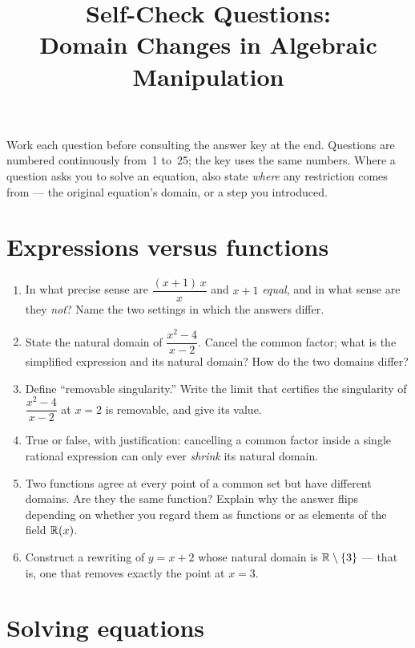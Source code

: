 \documentclass{essay}
\title{Self-Check Questions:\\Domain Changes in Algebraic Manipulation}
\author{}
\date{}
\begin{document}
\maketitle

Work each question before consulting the answer key at the end. Questions are numbered
continuously from~1 to~25; the key uses the same numbers. Where a question asks you to
solve an equation, also state \emph{where} any restriction comes from --- the original
equation's domain, or a step you introduced.

\section{Expressions versus functions}

\begin{enumerate}

  \item In what precise sense are $\dfrac{(x+1)\,x}{x}$ and $x+1$ \emph{equal}, and in what
    sense are they \emph{not}? Name the two settings in which the answers differ.

  \item State the natural domain of $\dfrac{x^2-4}{x-2}$. Cancel the common factor; what is
    the simplified expression and its natural domain? How do the two domains differ?

  \item Define ``removable singularity.'' Write the limit that certifies the singularity of
    $\dfrac{x^2-4}{x-2}$ at $x=2$ is removable, and give its value.

  \item True or false, with justification: cancelling a common factor inside a single rational
    expression can only ever \emph{shrink} its natural domain.

  \item Two functions agree at every point of a common set but have different domains. Are they
    the same function? Explain why the answer flips depending on whether you regard them as
    functions or as elements of the field $\mathbb{R}(x)$.

  \item Construct a rewriting of $y = x+2$ whose natural domain is $\mathbb{R}\setminus\{3\}$
    --- that is, one that removes exactly the point at $x=3$.

\end{enumerate}

\section{Solving equations}
\end{document}
